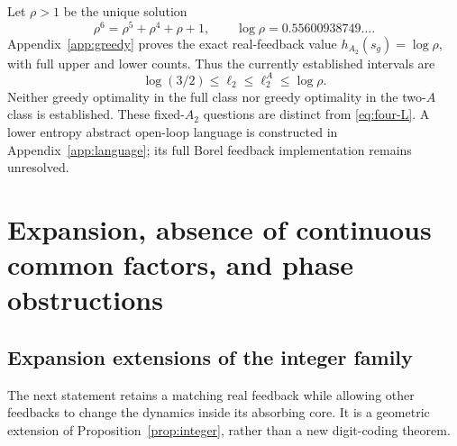 \documentclass[11pt,reqno]{amsart}
\numberwithin{equation}{section}
\theoremstyle{definition}
\begin{document}
Let $\rho>1$ be the unique solution
\begin{equation}\label{eq:rho}
 \rho^6=\rho^5+\rho^4+\rho+1,
 \qquad\log\rho=0.55600938749\ldots.
\end{equation}
Appendix~\ref{app:greedy} proves the exact real-feedback value
$h_{A_2}(s_g)=\log\rho$, with full upper and lower counts.
Thus the currently established intervals are
\begin{equation}\label{eq:four-even}
 \log(3/2)\le\ell_2\le\ell_2^A\le\log\rho.
\end{equation}
Neither greedy optimality in the full class nor greedy optimality
in the two-$A$ class is established. These fixed-$A_2$ questions
are distinct from \eqref{eq:four-L}. A lower entropy abstract
open-loop language is constructed in Appendix~\ref{app:language};
its full Borel feedback implementation remains unresolved.

\section{Expansion, absence of continuous common factors, and phase obstructions}
\label{sec:extensions}

\subsection{Expansion extensions of the integer family}
The next statement retains a matching real feedback while allowing other
feedbacks to change the dynamics inside its absorbing core. It is a
geometric extension of Proposition~\ref{prop:integer}, rather than a
new digit-coding theorem.
\end{document}
